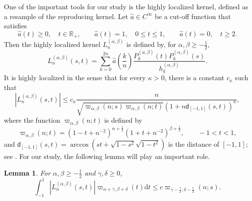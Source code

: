 \documentclass{amsart}
\newtheorem{lem}[thm]{Lemma}
\theoremstyle{remark}
\def\d{\mathrm{d}}
\def\a{{\alpha}}
\def\b{{\beta}}
\def\g{{\gamma}}
\def\k{{\kappa}}
\def\RR{{\mathbb R}}
\def\d{\mathrm{d}}
\def\sd{{\mathsf d}}
\def\a{{\alpha}}
\def\b{{\beta}}
\def\g{{\gamma}}
\def\k{{\kappa}}
\def\RR{{\mathbb R}}
\newcommand{\wh}{\widehat}
\def\f{\frac}
\def\f{\frac}
\begin{document}
One of the important tools for our study is the highly localized kernel, defined as a resample of the reproducing kernel. 
Let $\wh a \in C^\infty$ be a cut-off function that satisfies 
\begin{equation} \label{eq:cut-off}
 \wh a(t) \ge 0, \quad t\in \RR_+, \qquad \wh a (t) = 1, \quad 0 \le t\le 1, \qquad \wh a(t) = 0, \quad t\ge 2.
\end{equation}
Then the highly localized kernel $L_n^{(\a,\b)}$ is defined by, for $\a, \b \ge - \f12$,  
\begin{equation} \label{eq:Ln-Jacobi}
  L_n^{(\a,\b)}(s,t) = \sum_{k=0}^{2n} \wh a \left(\frac k  n \right) \frac{P_k^{(a,\b)}(t) P_k^{(\a,\b)}(s)}{h_k^{(\a,\b)}}.
\end{equation}
It is highly localized in the sense that for every $\k > 0$, there is a constant $c_\k$ such that
\begin{equation} \label{eq:kernel_Jacobi}
  \left| L_n^{(\a,\b)}(s,t) \right| \le c_\k \frac{n}{ \sqrt{\varpi_{\a,\b}(n;s)\varpi_{\a,\b}(n;t)} (1+n \sd_{[-1,1]}(s,t))^\k},
\end{equation}
where the function $\varpi_{\a,\b}(n;t)$ is defined by 
$$
    \varpi_{\a,\b}(n;t) = (1-t+n^{-2})^{\a+\f12} (1+t+n^{-2})^{\b+\f12}, \qquad -1<t<1,
$$
and $\sd_{[-1,1]} (s,t) = \arccos(s t + \sqrt{1-s^2} \sqrt{1-t^2})$ is the distance of $[-1,1]$; see \cite[Theorem 2.4]{PX}.
For our study, the following lemma will play an important role. 

\begin{lem} \label{eq:int_Jacobi_ker}
For $\a,\b\ge -\f12$ and $\g,\delta \ge 0$, 
$$
   \int_{-1}^1  |L_n^{(\a,\b)}(s,t)| \varpi_{\a+\g,\b+\delta}(t) \d t \le c \varpi_{\g-\f12,\delta-\f12}(n;s). 
$$
\end{lem}
\end{document}
